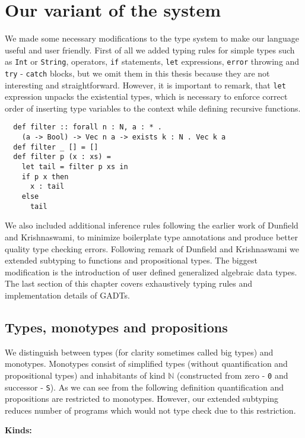 \documentclass[declaration,shortabstract,english]{iithesis}
\begin{document}
\section{Our variant of the system}
We made some necessary modifications to the type system to make our language useful and user friendly.
First of all we added typing rules for simple types such as
\verb+Int+ or \verb+String+, operators, \verb+if+ statements, \verb+let+ expressions,
\verb+error+ throwing and \verb+try+ - \verb+catch+ blocks, but we omit them in this thesis because
they are not interesting and straightforward. However, it is important to remark, that \verb+let+ expression unpacks the
existential types, which is necessary to enforce correct order of inserting type variables to the context while defining
recursive functions.
\begin{verbatim}
  def filter :: forall n : N, a : * .
    (a -> Bool) -> Vec n a -> exists k : N . Vec k a
  def filter _ [] = []
  def filter p (x : xs) =
    let tail = filter p xs in
    if p x then
      x : tail
    else
      tail
\end{verbatim}
We also included additional inference rules following the earlier work of Dunfield and Krishnaswami\cite{Dunfield13:bidir},
to minimize boilerplate type annotations and produce better quality type checking errors. Following
remark of Dunfield and Krishnaswami\cite{gadt-popl19} we extended subtyping to functions and propositional types.
The biggest modification is the introduction of user defined generalized algebraic data types. The last section
of this chapter covers exhaustively typing rules and implementation details of GADTs. %

\subsection*{Types, monotypes and propositions}

We distinguish between types (for clarity sometimes called big types) and monotypes.
Monotypes consist of simplified types (without quantification and propositional types) and
inhabitants of kind $\mathbb{N}$ (constructed from zero - \verb+0+ and successor - \verb+S+).
As we can see from the following definition quantification and propositions are restricted to monotypes.
However, our extended subtyping reduces number of programs which would not type check due to this restriction.

\textbf{Kinds:}
\end{document}

